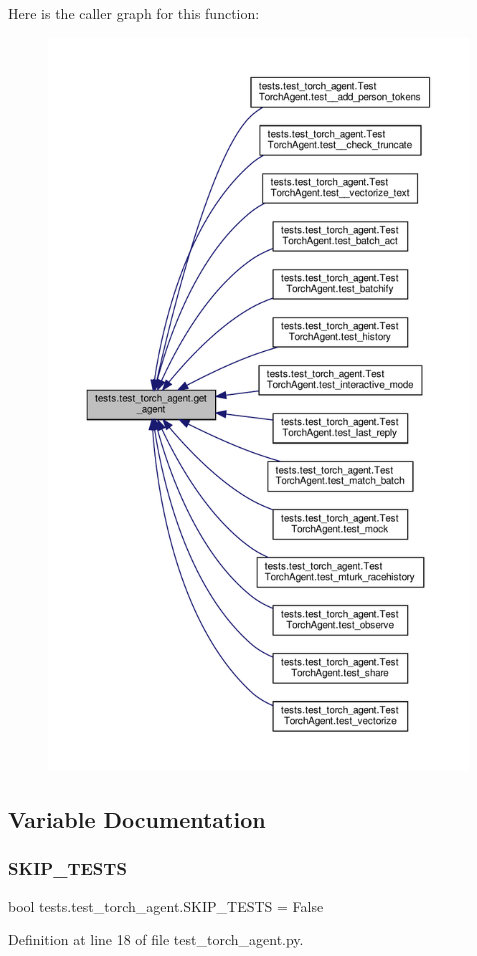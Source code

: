 Here is the caller graph for this function\+:
\nopagebreak
\begin{figure}[H]
\begin{center}
\leavevmode
\includegraphics[height=550pt]{namespacetests_1_1test__torch__agent_ae929d109305aaea29fbfa13ecf1f32e9_icgraph}
\end{center}
\end{figure}


\subsection{Variable Documentation}
\mbox{\label{namespacetests_1_1test__torch__agent_a158dbc1f1b2ee55f020fb0ad7a99c116}} 
\subsubsection{\texorpdfstring{S\+K\+I\+P\+\_\+\+T\+E\+S\+TS}{SKIP\_TESTS}}
{\footnotesize\ttfamily bool tests.\+test\+\_\+torch\+\_\+agent.\+S\+K\+I\+P\+\_\+\+T\+E\+S\+TS = False}



Definition at line 18 of file test\+\_\+torch\+\_\+agent.\+py.

